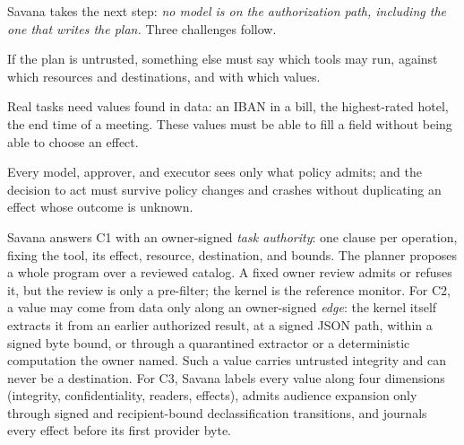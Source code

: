 \documentclass[letterpaper,twocolumn,10pt]{article}
\newcommand{\sys}{Savana}
\begin{document}
\sys{} takes the next step: \emph{no model is on the authorization path,
including the one that writes the plan.} Three challenges follow.
\begin{description}[style=nextline,font=\bfseries]
\item[C1: Authority without a trusted planner.] If the plan is untrusted,
  something else must say which tools may run, against which resources and
  destinations, and with which values.
\item[C2: Data-dependent tasks.] Real tasks need values found in data: an
  IBAN in a bill, the highest-rated hotel, the end time of a meeting. These
  values must be able to fill a field without being able to choose an
  effect.
\item[C3: Mediated disclosure and durable effects.] Every model, approver,
  and executor sees only what policy admits; and the decision to act must
  survive policy changes and crashes without duplicating an effect whose
  outcome is unknown.
\end{description}

\sys{} answers C1 with an owner-signed \emph{task authority}: one clause per
operation, fixing the tool, its effect, resource, destination, and bounds.
The planner proposes a whole program over a reviewed catalog. A fixed owner
review admits or refuses it, but the review is only a pre-filter; the kernel
is the reference monitor. For C2, a value may come from data only along an
owner-signed \emph{edge}: the kernel itself extracts it from an earlier
authorized result, at a signed JSON path, within a signed byte bound, or
through a quarantined extractor or a deterministic computation the owner
named. Such a value carries untrusted integrity and can never be a
destination. For C3, \sys{} labels every value along four dimensions
(integrity, confidentiality, readers, effects), admits audience expansion
only through signed and recipient-bound declassification transitions, and
journals every effect before its first provider byte.
\end{document}
